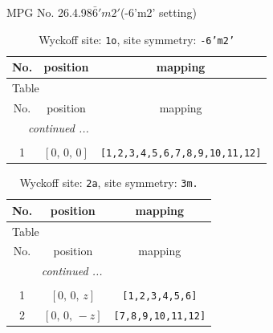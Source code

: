 \documentclass[fleqn,8pt]{jsarticle}
\begin{document}
\setcounter{MaxMatrixCols}{32}

\renewcommand{\tablename}{Table~}
\renewcommand{\figurename}{Figure~}
\begin{center}
\LARGE
MPG No. 26.4.98\quad$\bar{6}'m2'$\quad(-6'm2' setting)
\end{center}
\renewcommand{\arraystretch}{1.2}
\begin{longtable}{ccc}
\caption{Wyckoff site: {\tt 1o}, site symmetry: {\tt -6'm2'}}
 \\
 \hline \hline
No. & position & mapping \\ \hline \endfirsthead

\multicolumn{2}{l}{\tablename\ \thetable{}} \\
 \hline \hline
No. & position & mapping \\ \hline \endhead

 \hline \hline
\multicolumn{2}{r}{\footnotesize\it continued ...} \\ \endfoot

 \hline \hline
\multicolumn{2}{r}{} \\ \endlastfoot

1 & $\left[ 0,\, 0,\, 0 \right]$ & {\tt [1,2,3,4,5,6,7,8,9,10,11,12]} \\
\end{longtable}
\renewcommand{\arraystretch}{1.2}
\begin{longtable}{ccc}
\caption{Wyckoff site: {\tt 2a}, site symmetry: {\tt 3m.}}
 \\
 \hline \hline
No. & position & mapping \\ \hline \endfirsthead

\multicolumn{2}{l}{\tablename\ \thetable{}} \\
 \hline \hline
No. & position & mapping \\ \hline \endhead

 \hline \hline
\multicolumn{2}{r}{\footnotesize\it continued ...} \\ \endfoot

 \hline \hline
\multicolumn{2}{r}{} \\ \endlastfoot

1 & $\left[ 0,\, 0,\, z \right]$ & {\tt [1,2,3,4,5,6]} \\ \hline
2 & $\left[ 0,\, 0,\, - z \right]$ & {\tt [7,8,9,10,11,12]} \\
\end{longtable}
\renewcommand{\arraystretch}{1.2}
\end{document}
